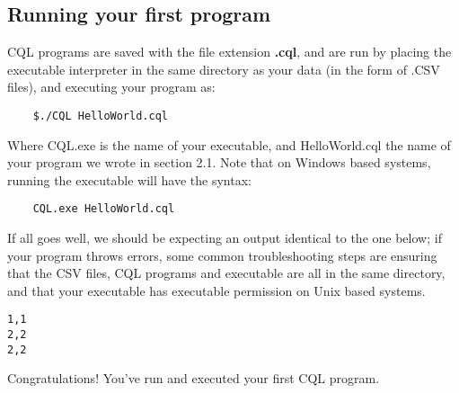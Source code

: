 \subsection{Running your first program}
\begin{normalsize}
CQL programs are saved with the file extension \textbf{.cql}, and are run by placing the executable interpreter in the same directory as your data (in the form of .CSV files), and executing your program as:
\begin{lstlisting}
	$./CQL HelloWorld.cql
\end{lstlisting}
Where CQL.exe is the name of your executable, and HelloWorld.cql the name of your program we wrote in section 2.1. Note that on Windows based systems, running the executable will have the syntax:
\begin{lstlisting}
	CQL.exe HelloWorld.cql
\end{lstlisting}
If all goes well, we should be expecting an output identical to the one below; if your program throws errors, some common troubleshooting steps are ensuring that the CSV files, CQL programs and executable are all in the same directory, and that your executable has executable permission on Unix based systems. 
\end{normalsize}
\begin{lstlisting}[style=framed]
1,1
2,2
2,2
\end{lstlisting}
\begin{normalsize}
Congratulations! You've run and executed your first CQL program. 
\end{normalsize}